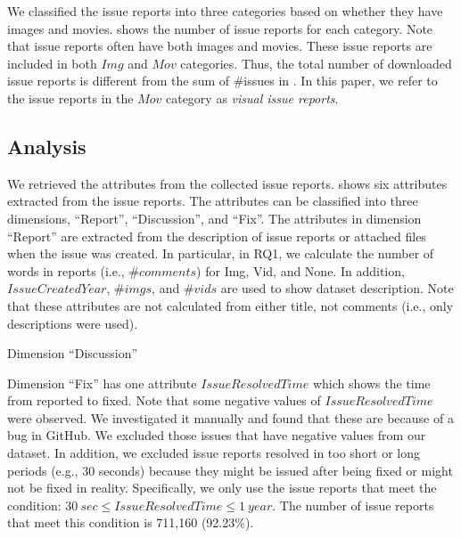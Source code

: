 
We classified the issue reports into three categories based on whether they have images and movies.  shows the number of issue reports for each category. 
Note that issue reports often have both images and movies. 
These issue reports are included in both $Img$ and $Mov$ categories. 
Thus, the total number of downloaded issue reports is different from 
the sum of \#issues in . 
In this paper, we refer to the issue reports in the $Mov$ category 
as \textit{visual issue reports}. 


% 

\subsection{Analysis}
We retrieved the attributes from the collected issue reports.
 shows six attributes extracted from the issue reports. The attributes can be classified into three dimensions, ``Report'', ``Discussion'', and ``Fix''. The attributes in dimension ``Report'' are extracted from the description of issue reports or attached files when the issue was created. In particular, in RQ1, we calculate the number of words in reports (i.e., $\#comments$) for Img, Vid, and None. 
In addition, $IssueCreatedYear$, $\#imgs$, and $\#vids$ are used to show dataset description. Note that these attributes are not calculated from either title, not comments (i.e., only descriptions were used). 

Dimension ``Discussion''

Dimension ``Fix'' has one attribute $IssueResolvedTime$ which shows the time from reported to fixed. 
Note that some negative values of $IssueResolvedTime$ were observed. We investigated it manually and found that these are because of a bug in GitHub.  We excluded those issues that have negative values from our dataset. 
In addition, we excluded issue reports resolved in too short or long periods (e.g., 30 seconds) because they might be issued after being fixed or might not be fixed in reality. 
Specifically, we only use the issue reports that meet the condition: $30\ sec \leq IssueResolvedTime \leq 1\ year$.
The number of issue reports that meet this condition is 711,160 (92.23\%).


